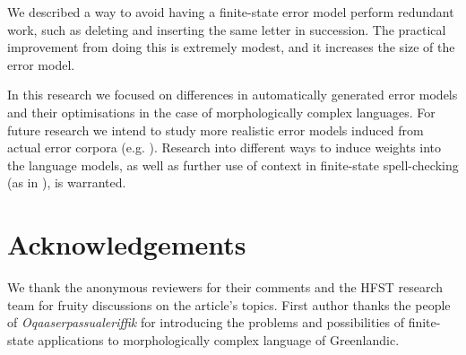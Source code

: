 \documentclass[11pt]{article}
\begin{document}
We described a way to avoid having a finite-state error model perform
redundant work, such as deleting and inserting the same letter in succession.
The practical improvement from doing this is extremely modest, and it increases
the size of the error model.

In this research we focused on differences in automatically generated error
models and their optimisations in the case of morphologically complex languages.
For future research we intend to study more realistic error models induced from
actual error corpora (e.g. ). Research into
different ways to induce weights into the language models, as well as further use
of context in finite-state spell-checking (as in
), is warranted.

\section*{Acknowledgements} 

We thank the anonymous reviewers for their comments and the HFST research
team for fruity discussions on the article's topics. First author thanks the 
people of \emph{Oqaaserpassualeriffik} for introducing the problems and 
possibilities of finite-state applications to morphologically complex language
of Greenlandic.



\end{document}
